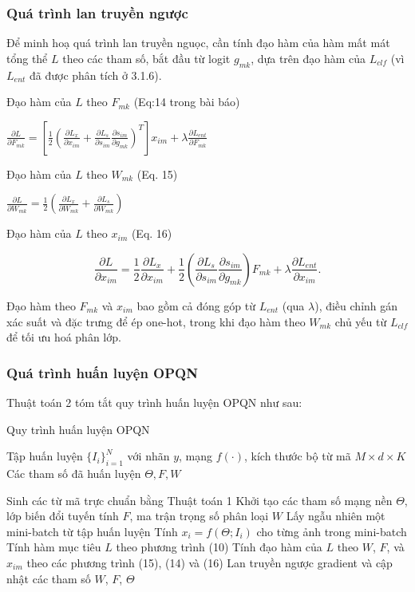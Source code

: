 \subsubsection{Quá trình lan truyền ngược}
Để minh hoạ quá trình lan truyền nguọc, cần tính đạo hàm của hàm mất mát tổng thể $L$ theo các tham số, bắt đầu từ logit $g_{mk}$, dựa trên đạo hàm của $L_{clf}$ (vì $L_{ent}$ đã được phân tích ở 3.1.6). 

Đạo hàm của $L$ theo $F_{mk}$ (Eq:14 trong bài báo)

$\frac{\partial L}{\partial F_{mk}} = \left[ \frac{1}{2} \left( \frac{\partial L_x}{\partial x_{im}} + \frac{\partial L_s}{\partial s_{im}} \frac{\partial s_{im}}{\partial g_{mk}} \right)^T \right] x_{im} + \lambda \frac{\partial L_{ent}}{\partial F_{mk}}$

Đạo hàm của $L$ theo $W_{mk}$ (Eq. 15)

$\frac{\partial L}{\partial W_{mk}} = \frac{1}{2} \left( \frac{\partial L_x}{\partial W_{mk}} + \frac{\partial L_s}{\partial W_{mk}} \right)$

Đạo hàm của $L$ theo $x_{im}$ (Eq. 16)

$$\frac{\partial L}{\partial x_{im}} = \frac{1}{2} \frac{\partial L_x}{\partial x_{im}} + \frac{1}{2} \left( \frac{\partial L_s}{\partial s_{im}} \frac{\partial s_{im}}{\partial g_{mk}} \right) F_{mk} + \lambda \frac{\partial L_{ent}}{\partial x_{im}}.$$

Đạo hàm theo $F_{mk}$ và $x_{im}$ bao gồm cả đóng góp từ $L_{ent}$ (qua $\lambda$), điều chỉnh gán xác suất và đặc trưng để ép one-hot, trong khi đạo hàm theo $W_{mk}$ chủ yếu từ $L_{clf}$ để tối ưu hoá phân lớp. 

\subsubsection{Quá trình huấn luyện OPQN}
Thuật toán 2 tóm tắt quy trình huấn luyện OPQN như sau: 
\begin{algorithm}
\caption{Quy trình huấn luyện OPQN}
\begin{algorithmic}[2]
\Require Tập huấn luyện $\{I_i\}_{i=1}^N$ với nhãn $y$, mạng $f(\cdot)$, kích thước bộ từ mã $M \times d \times K$
\Ensure Các tham số đã huấn luyện $\Theta, F, W$

\State Sinh các từ mã trực chuẩn bằng Thuật toán 1
\State Khởi tạo các tham số mạng nền $\Theta$, lớp biến đổi tuyến tính $F$, ma trận trọng số phân loại $W$
\Repeat
    \State Lấy ngẫu nhiên một mini-batch từ tập huấn luyện
    \State Tính $x_i = f(\Theta; I_i)$ cho từng ảnh trong mini-batch
    \State Tính hàm mục tiêu $L$ theo phương trình (10)
    \State Tính đạo hàm của $L$ theo $W$, $F$, và $x_{im}$ theo các phương trình (15), (14) và (16)
    \State Lan truyền ngược gradient và cập nhật các tham số $W$, $F$, $\Theta$
\end{algorithmic}
\end{algorithm}

